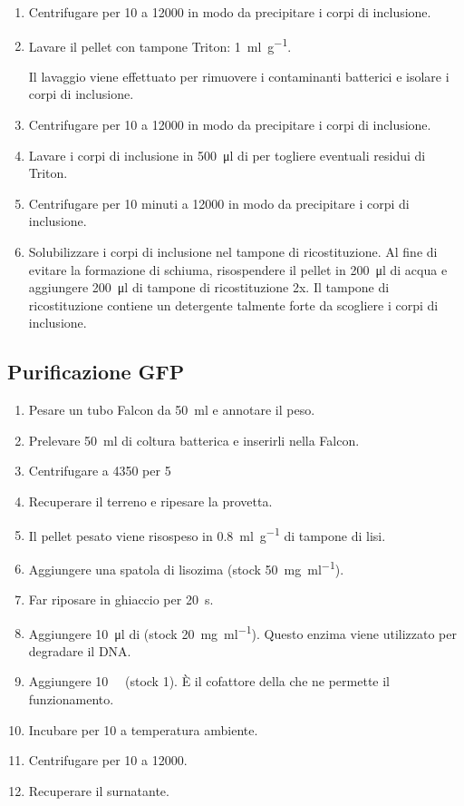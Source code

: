 \begin{enumerate}
	\item Centrifugare per \qty{10}{\min} a \qty{12000}{\giri} in modo da precipitare i corpi di inclusione.
	\item Lavare il pellet con tampone Triton: \qty{1}{\ml\per\g}. 
	\begin{Note}
		Il lavaggio viene effettuato per rimuovere i contaminanti batterici e isolare i corpi di inclusione.
	\end{Note}
	\item Centrifugare per \qty{10}{\min} a \qty{12000}{\giri} in modo da precipitare i corpi di inclusione.
	\item Lavare i corpi di inclusione in \qty{500}{\micro\litre} di  per togliere eventuali residui di Triton.
	\item Centrifugare per 10 minuti a \qty{12000}{\giri} in modo da precipitare i corpi di inclusione.
	\item Solubilizzare i corpi di inclusione nel tampone di ricostituzione. Al fine di evitare la formazione di schiuma, risospendere il pellet in \qty{200}{\micro\litre} di acqua e aggiungere \qty{200}{\micro\litre} di tampone di ricostituzione 2x. Il tampone di ricostituzione contiene un detergente talmente forte da scogliere i corpi di inclusione.
\end{enumerate}

\subsection{Purificazione GFP}
\begin{enumerate}
	\item Pesare un tubo Falcon da \qty{50}{\ml} e annotare il peso.
	\item Prelevare \qty{50}{\ml} di coltura batterica e inserirli nella Falcon.
	\item Centrifugare a \qty{4350}{\giri} per \qty{5}{\min}
	\item Recuperare il terreno e ripesare la provetta.
	\item Il pellet pesato viene risospeso in \qty{0.8}{\ml\per\g} di tampone di lisi.
	\item Aggiungere una spatola di lisozima (stock \qty{50}{\mg\per\ml}).
	\item Far riposare in ghiaccio per \qty{20}{\s}.
	\item Aggiungere \qty{10}{\micro\litre} di  (stock \qty{20}{\mg\per\ml}). Questo enzima viene utilizzato per degradare il DNA.
	\item Aggiungere \qty{10}{\milli\Molar}  (stock \qty{1}{\Molar}). È il cofattore della  che ne permette il funzionamento.
	\item Incubare per \qty{10}{\min} a temperatura ambiente.
	\item Centrifugare per  \qty{10}{\min} a \qty{12000}{\giri}.
	\item Recuperare il surnatante. 	
\end{enumerate}



